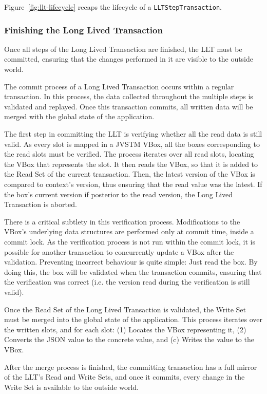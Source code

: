 \documentclass{llncs}
\begin{document}
Figure~\ref{fig:llt-lifecycle} recaps the lifecycle of a
\texttt{LLTStepTransaction}.

\subsubsection{Finishing the Long Lived Transaction}
\label{sec:jvstm-commit}

Once all steps of the Long Lived Transaction are finished, the LLT
must be committed, ensuring that the changes performed in it are
visible to the outside world.

The commit process of a Long Lived Transaction occurs within a regular
transaction. In this process, the data collected throughout the
multiple steps is validated and replayed. Once this transaction
commits, all written data will be merged with the global state of the
application.

The first step in committing the LLT is verifying whether all the read
data is still valid. As every slot is mapped in a JVSTM VBox, all the
boxes corresponding to the read slots must be verified. The process
iterates over all read slots, locating the VBox that represents the
slot. It then reads the VBox, so that it is added to the Read Set of
the current transaction. Then, the latest version of the VBox is
compared to context's version, thus ensuring that the read value was
the latest. If the box's current version if posterior to the read
version, the Long Lived Transaction is aborted.

There is a critical subtlety in this verification
process. Modifications to the VBox's underlying data structures are
performed only at commit time, inside a commit lock. As the
verification process is not run within the commit lock, it is possible
for another transaction to concurrently update a VBox after the
validation. Preventing incorrect behaviour is quite simple: Just read
the box. By doing this, the box will be validated when the transaction
commits, ensuring that the verification was correct (i.e. the version
read during the verification is still valid).

Once the Read Set of the Long Lived Transaction is validated, the
Write Set must be merged into the global state of the
application. This process iterates over the written slots, and for
each slot: (1) Locates the VBox representing it, (2) Converts the JSON
value to the concrete value, and (c) Writes the value to the VBox.

After the merge process is finished, the committing transaction has a
full mirror of the LLT's Read and Write Sets, and once it commits,
every change in the Write Set is available to the outside world.
\end{document}
